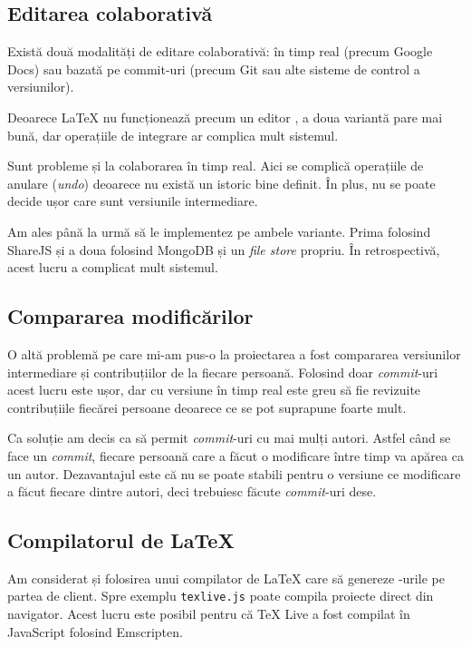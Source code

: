 \documentclass[a4wide,12pt]{report}
\newcommand{\eng}[1]{\emph{#1}} %
\newcommand{\cod}[1]{\texttt{#1}}
\newcommand{\acr}[1]{{\textsmaller[1]{\textsc{#1}}}} %
\begin{document}
\subsection{Editarea colaborativă}

Există două modalități de editare colaborativă: în timp real (precum Google
Docs) sau bazată pe commit-uri (precum Git sau alte sisteme de control a
versiunilor).

Deoarece \LaTeX{} nu funcționează precum un editor \acr{WYSIWYG}, a doua
variantă pare mai bună, dar operațiile de integrare ar complica mult sistemul.

Sunt probleme și la colaborarea în timp real. Aici se complică operațiile de
anulare (\eng{undo}) deoarece nu există un istoric bine definit. În plus, nu se
poate decide ușor care sunt versiunile intermediare.

Am ales până la urmă să le implementez pe ambele variante. Prima folosind
ShareJS și a doua folosind MongoDB și un \eng{file store} propriu. În
retrospectivă, acest lucru a complicat mult sistemul.

\subsection{Compararea modificărilor}

O altă problemă pe care mi-am pus-o la proiectarea a fost compararea versiunilor
intermediare și contribuțiilor de la fiecare persoană. Folosind doar
\eng{commit}-uri acest lucru este ușor, dar cu versiune în timp real este greu
să fie revizuite contribuțiile fiecărei persoane deoarece ce se pot suprapune
foarte mult.

Ca soluție am decis ca să permit \eng{commit}-uri cu mai mulți autori. Astfel
când se face un \eng{commit}, fiecare persoană care a făcut o modificare între
timp va apărea ca un autor. Dezavantajul este că nu se poate stabili pentru o
versiune ce modificare a făcut fiecare dintre autori, deci trebuiesc făcute
\eng{commit}-uri dese.

\subsection{Compilatorul de \LaTeX}

Am considerat și folosirea unui compilator de \LaTeX{} care să genereze
\acr{PDF}-urile pe partea de client. Spre exemplu \cod{texlive.js}\cite{texlivejs}
poate compila proiecte direct din navigator. Acest lucru este posibil pentru că
\TeX{} Live a fost compilat în JavaScript folosind Emscripten.
\end{document}
